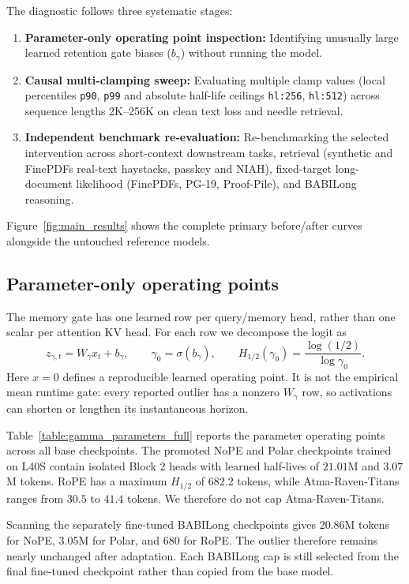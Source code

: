 The diagnostic follows three systematic stages:
\begin{enumerate}
  \item \textbf{Parameter-only operating point inspection:} Identifying unusually large learned retention gate biases ($b_\gamma$) without running the model.
  \item \textbf{Causal multi-clamping sweep:} Evaluating multiple clamp values (local percentiles \texttt{p90}, \texttt{p99} and absolute half-life ceilings \texttt{hl:256}, \texttt{hl:512}) across sequence lengths 2K--256K on clean text loss and needle retrieval.
  \item \textbf{Independent benchmark re-evaluation:} Re-benchmarking the selected intervention across short-context downstream tasks, retrieval (synthetic and FinePDFs real-text haystacks, passkey and NIAH), fixed-target long-document likelihood (FinePDFs, PG-19, Proof-Pile), and BABILong reasoning.
\end{enumerate}

Figure~\ref{fig:main_results} shows the complete primary before/after curves alongside the untouched reference models.

\subsection{Parameter-only operating points}
The memory gate has one learned row per query/memory head, rather than one scalar per attention KV head. For each row we decompose the logit as
\begin{equation}
 z_{\gamma,t}=W_\gamma x_t+b_\gamma,\qquad
 \gamma_0=\sigma(b_\gamma),\qquad
 H_{1/2}(\gamma_0)=\frac{\log(1/2)}{\log\gamma_0}.
\end{equation}
Here $x=0$ defines a reproducible learned operating point. It is not the empirical mean runtime gate: every reported outlier has a nonzero $W_\gamma$ row, so activations can shorten or lengthen its instantaneous horizon.

Table~\ref{table:gamma_parameters_full} reports the parameter operating points across all base checkpoints. The promoted NoPE and Polar checkpoints trained on L40S contain isolated Block 2 heads with learned half-lives of $21.01$M and $3.07$M tokens. RoPE has a maximum $H_{1/2}$ of 682.2 tokens, while Atma-Raven-Titans ranges from $30.5$ to $41.4$ tokens. We therefore do not cap Atma-Raven-Titans.

Scanning the separately fine-tuned BABILong checkpoints gives 20.86M tokens for NoPE, 3.05M for Polar, and 680 for RoPE. The outlier therefore remains nearly unchanged after adaptation. Each BABILong cap is still selected from the final fine-tuned checkpoint rather than copied from the base model.

